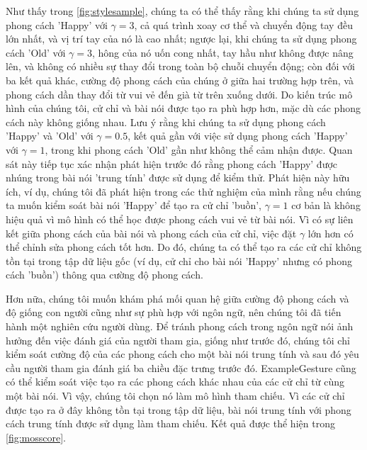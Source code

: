 Như thấy trong \autoref{fig:stylesample}, chúng ta có thể thấy rằng khi chúng ta sử dụng phong cách 'Happy' với $\gamma=3$, cả quá trình xoay cơ thể và chuyển động tay đều lớn nhất, và vị trí tay của nó là cao nhất; ngược lại, khi chúng ta sử dụng phong cách 'Old' với $\gamma=3$, hông của nó uốn cong nhất, tay hầu như không được nâng lên, và không có nhiều sự thay đổi trong toàn bộ chuỗi chuyển động; còn đối với ba kết quả khác, cường độ phong cách của chúng ở giữa hai trường hợp trên, và phong cách dần thay đổi từ vui vẻ đến già từ trên xuống dưới. Do kiến trúc mô hình của chúng tôi, cử chỉ và bài nói được tạo ra phù hợp hơn, mặc dù các phong cách này không giống nhau. Lưu ý rằng khi chúng ta sử dụng phong cách 'Happy' và 'Old' với $\gamma=0.5$, kết quả gần với việc sử dụng phong cách 'Happy' với $\gamma=1$, trong khi phong cách 'Old' gần như không thể cảm nhận được. Quan sát này tiếp tục xác nhận phát hiện trước đó rằng phong cách 'Happy' được nhúng trong bài nói 'trung tính' được sử dụng để kiểm thử. Phát hiện này hữu ích, ví dụ, chúng tôi đã phát hiện trong các thử nghiệm của mình rằng nếu chúng ta muốn kiểm soát bài nói 'Happy' để tạo ra cử chỉ 'buồn', $\gamma=1$ cơ bản là không hiệu quả vì mô hình có thể học được phong cách vui vẻ từ bài nói. Vì có sự liên kết giữa phong cách của bài nói và phong cách của cử chỉ, việc đặt $\gamma$ lớn hơn có thể chỉnh sửa phong cách tốt hơn. Do đó, chúng ta có thể tạo ra các cử chỉ không tồn tại trong tập dữ liệu gốc (ví dụ, cử chỉ cho bài nói 'Happy' nhưng có phong cách 'buồn') thông qua cường độ phong cách.


Hơn nữa, chúng tôi muốn khám phá mối quan hệ giữa cường độ phong cách và độ giống con người cũng như sự phù hợp với ngôn ngữ, nên chúng tôi đã tiến hành một nghiên cứu người dùng. Để tránh phong cách trong ngôn ngữ nói ảnh hưởng đến việc đánh giá của người tham gia, giống như trước đó, chúng tôi chỉ kiểm soát cường độ của các phong cách cho một bài nói trung tính và sau đó yêu cầu người tham gia đánh giá ba chiều đặc trưng trước đó. ExampleGesture \cite{ghorbani2023zeroeggs} cũng có thể kiểm soát việc tạo ra các phong cách khác nhau của các cử chỉ từ cùng một bài nói. Vì vậy, chúng tôi chọn nó làm mô hình tham chiếu. Vì các cử chỉ được tạo ra ở đây không tồn tại trong tập dữ liệu, bài nói trung tính với phong cách trung tính được sử dụng làm tham chiếu. Kết quả được thể hiện trong \autoref{fig:mosscore}.




